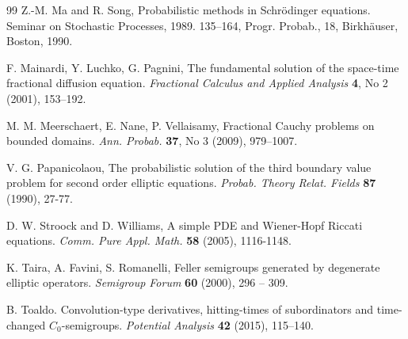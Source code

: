 \documentclass[11pt,a4paper]{article}
\newcommand{\magenta}{black}
\begin{document}
\begin{thebibliography}{99}
{\color{\magenta}
Z.-M. Ma and R. Song, 
Probabilistic methods in Schr\"{o}dinger equations. 
Seminar on Stochastic Processes, 1989. 135–164, Progr. Probab., 18, Birkh\"{a}user, Boston, 1990.
}


F. Mainardi, Y. Luchko, G. Pagnini,
The fundamental solution of the space-time fractional diffusion equation. 
\textit{Fractional Calculus and Applied Analysis} \textbf{4}, No 2 (2001), 153--192. 




M. M. Meerschaert, E. Nane, P. Vellaisamy,
Fractional Cauchy problems on bounded domains.
\textit{Ann. Probab.} \textbf{37}, No 3 (2009), 979--1007.



V. G. Papanicolaou,
The probabilistic solution of the third boundary value problem for second order elliptic equations.
\textit{Probab. Theory Relat. Fields} \textbf{87} (1990), 27-77.

%



D. W. Stroock and D. Williams,
A simple PDE and Wiener-Hopf Riccati equations.
\textit{Comm. Pure Appl. Math.} {\bf 58} (2005), 1116-1148. 


K. Taira, A. Favini, S. Romanelli, 
Feller semigroups generated by degenerate elliptic operators. 
\textit{Semigroup Forum} {\bf  60} (2000), 296 -- 309.

{B. Toaldo.} 
Convolution-type derivatives, hitting-times of subordinators and time-changed $C_0$-semigroups. 
\textit{Potential Analysis} \textbf{42} (2015), 115--140.


\end{thebibliography}
\end{document}
